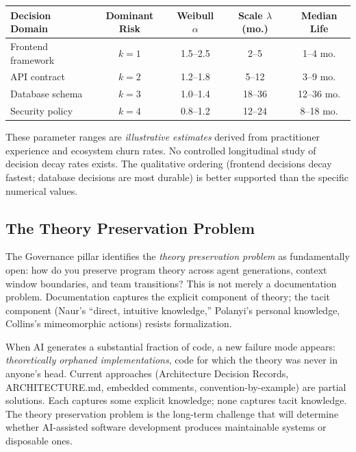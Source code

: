 \documentclass[11pt, a4paper, logo, copyright]{googledeepmind}
\begin{document}
\begin{center}
\begin{tabular}{lcccc}
\toprule
Decision Domain & Dominant Risk & Weibull $\alpha$ & Scale $\lambda$ (mo.) & Median Life \\
\midrule
Frontend framework & $k=1$ & 1.5--2.5 & 2--5 & 1--4 mo. \\
API contract & $k=2$ & 1.2--1.8 & 5--12 & 3--9 mo. \\
Database schema & $k=3$ & 1.0--1.4 & 18--36 & 12--36 mo. \\
Security policy & $k=4$ & 0.8--1.2 & 12--24 & 8--18 mo. \\
\bottomrule
\end{tabular}
\end{center}

These parameter ranges are \emph{illustrative estimates} derived from practitioner experience and ecosystem churn rates. No controlled longitudinal study of decision decay rates exists. The qualitative ordering (frontend decisions decay fastest; database decisions are most durable) is better supported than the specific numerical values.

\subsection{The Theory Preservation Problem}

The Governance pillar identifies the \emph{theory preservation problem} as fundamentally open: how do you preserve program theory across agent generations, context window boundaries, and team transitions? This is not merely a documentation problem. Documentation captures the explicit component of theory; the tacit component (Naur's ``direct, intuitive knowledge,'' Polanyi's personal knowledge, Collins's mimeomorphic actions) resists formalization.

When AI generates a substantial fraction of code, a new failure mode appears: \emph{theoretically orphaned implementations}, code for which the theory was never in anyone's head. Current approaches (Architecture Decision Records, ARCHITECTURE.md, embedded comments, convention-by-example) are partial solutions. Each captures some explicit knowledge; none captures tacit knowledge. The theory preservation problem is the long-term challenge that will determine whether AI-assisted software development produces maintainable systems or disposable ones.
\end{document}
